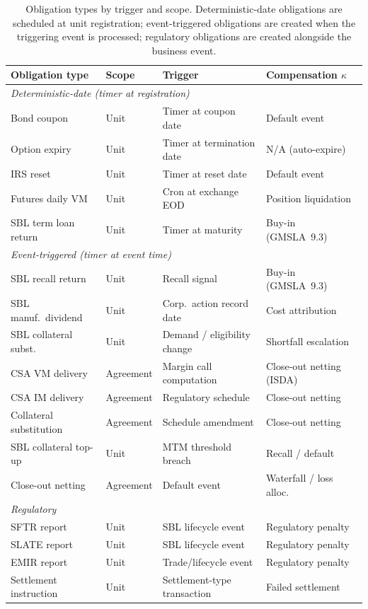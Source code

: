 \begin{table}[ht]
\centering
\small
\begin{tabular}{l l l l}
\toprule
\textbf{Obligation type} & \textbf{Scope} & \textbf{Trigger} & \textbf{Compensation $\kappa$} \\
\midrule
\multicolumn{4}{l}{\textit{Deterministic-date (timer at registration)}} \\
Bond coupon & Unit & Timer at coupon date & Default event \\
Option expiry & Unit & Timer at termination date & N/A (auto-expire) \\
IRS reset & Unit & Timer at reset date & Default event \\
Futures daily VM & Unit & Cron at exchange EOD & Position liquidation \\
SBL term loan return & Unit & Timer at maturity & Buy-in (GMSLA~9.3) \\
\midrule
\multicolumn{4}{l}{\textit{Event-triggered (timer at event time)}} \\
SBL recall return & Unit & Recall signal & Buy-in (GMSLA~9.3) \\
SBL manuf.\ dividend & Unit & Corp.\ action record date & Cost attribution \\
SBL collateral subst. & Unit & Demand / eligibility change & Shortfall escalation \\
CSA VM delivery & Agreement & Margin call computation & Close-out netting (ISDA) \\
CSA IM delivery & Agreement & Regulatory schedule & Close-out netting \\
Collateral substitution & Agreement & Schedule amendment & Close-out netting \\
SBL collateral top-up & Unit & MTM threshold breach & Recall / default \\
Close-out netting & Agreement & Default event & Waterfall / loss alloc. \\
\midrule
\multicolumn{4}{l}{\textit{Regulatory}} \\
SFTR report & Unit & SBL lifecycle event & Regulatory penalty \\
SLATE report & Unit & SBL lifecycle event & Regulatory penalty \\
EMIR report & Unit & Trade/lifecycle event & Regulatory penalty \\
Settlement instruction & Unit & Settlement-type transaction & Failed settlement \\
\bottomrule
\end{tabular}
\caption{Obligation types by trigger and scope. Deterministic-date obligations are scheduled at unit registration; event-triggered obligations are created when the triggering event is processed; regulatory obligations are created alongside the business event.}
\label{tab:obligation-types}
\end{table}


